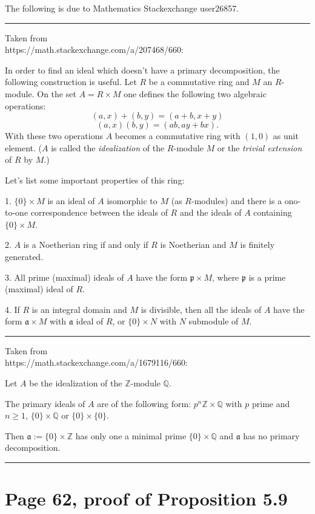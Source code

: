 \documentclass[12pt]{article}
\newcommand{\mf}{\mathfrak}
\begin{document}
The following is due to Mathematics Stackexchange user26857.\bigskip\bigskip

\hrule\bigskip

Taken from\\ https://math.stackexchange.com/a/207468/660:

In order to find an ideal which doesn't have a primary decomposition, the following construction is useful. Let $R$ be a commutative ring and $M$ an $R$-module. On the set $A=R\times M$ one defines the following two algebraic operations:
$$
(a,x)+(b,y)=(a+b,x+y)
$$
$$
(a,x)(b,y)=(ab,ay+bx).
$$
With these two operations $A$ becomes a commutative ring with $(1,0)$ as unit element. ($A$
is called the \emph{idealization} of the $R$-module $M$ or the \emph{trivial extension} of $R$ by $M$.)

Let's list some important properties of this ring:

1. $\{0\}\times M$ is an ideal of $A$ isomorphic to $M$ (as $R$-modules) and there is a ono-to-one correspondence between the ideals of $R$ and the ideals of $A$ containing $\{0\}\times M$.

2. $A$ is a Noetherian ring if and only if $R$ is Noetherian and $M$ is finitely generated.

3. All prime (maximal) ideals of $A$ have the form $\mf p\times M$, where $\mf p$ is a prime (maximal) ideal of $R$.

4. If $R$ is an integral domain and $M$ is divisible, then all the ideals of $A$ have the form $\mf a\times M$ with $\mf a$ ideal of $R$, or $\{0\}\times N$ with $N$ submodule of $M$.\bigskip\bigskip

\hrule\bigskip

Taken from\\ https://math.stackexchange.com/a/1679116/660:

Let $A$ be the idealization of the $\mathbb Z$-module $\mathbb Q$.   

The primary ideals of $A$ are of the following form: $p^n\mathbb Z\times\mathbb Q$ with $p$ prime and $n\ge1$, $\{0\}\times\mathbb Q$ or $\{0\}\times\{0\}$.   

Then $\mf a:=\{0\}\times\mathbb Z$ has only one a minimal prime $\{0\}\times\mathbb Q$ and $\mf a$ has no primary decomposition.\bigskip%

\hrule\bigskip

\section{Page 62, proof of Proposition 5.9}%
\end{document}
